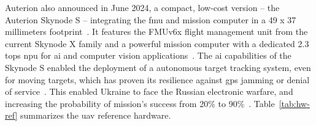 Auterion also announced in June 2024, a compact, low-cost version -- the
Auterion Skynode S -- integrating the \gls{fmu} and mission computer in a 49 x
37 millimeters footprint~\cite{skynodeS-pressRelease}. It features the FMUv6x
flight management unit from the current Skynode X family and a powerful mission
computer with a dedicated 2.3 \gls{tops} \gls{npu} for \gls{ai} and computer
vision applications~\cite{skynodeS-pressRelease}.
%
%
The \gls{ai} capabilities of the Skynode S enabled the deployment of a
autonomous target tracking system, even for moving targets, which has proven its resilience against
\gls{gps} jamming or denial of service~\cite{skynodeS-noJamming}. This enabled
Ukraine to face the Russian electronic warfare, and increasing the probability
of mission's success from 20\% to 90\%~\cite{skynodeS-noJamming-2}.
%
Table~\ref{tab:hw-ref} summarizes the \gls{uav} reference hardware.
